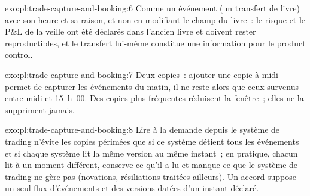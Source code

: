 \begin{solution}{exo:pl:trade-capture-and-booking:6}
Comme un événement (un transfert de livre) avec son heure et sa raison, et non en modifiant le champ du livre~: le risque et le P\&L de la veille ont été déclarés dans
l'ancien livre et doivent rester reproductibles, et le transfert lui-même constitue une information pour le product control.
\end{solution}

\begin{solution}{exo:pl:trade-capture-and-booking:7}
Deux copies~: ajouter une copie à midi permet de capturer les événements du matin, il ne reste alors que ceux survenus entre midi et 15~h~00. Des copies plus fréquentes réduisent
la fenêtre~; elles ne la suppriment jamais.
\end{solution}

\begin{solution}{exo:pl:trade-capture-and-booking:8}
Lire à la demande depuis le système de trading n'évite les copies périmées que si ce système détient tous les événements et si chaque système lit la même
version au même instant~; en pratique, chacun lit à un moment différent, conserve ce qu'il a lu et manque ce que le système de trading ne gère pas
(novations, résiliations traitées ailleurs). Un accord suppose un seul flux d'événements et des versions datées d'un instant déclaré.
\end{solution}

